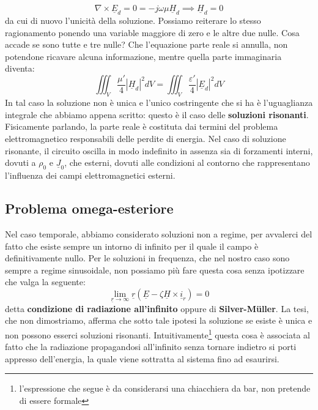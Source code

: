 \documentclass{book}
\begin{document}
\begin{equation}
    \nabla \times \underline{E}_{d} = 0 = -j \omega \mu \underline{H}_{d} \implies \underline{H}_{d}=0
\end{equation}
da cui di nuovo l'unicità della soluzione. Possiamo reiterare lo stesso ragionamento ponendo una variable maggiore di zero e le altre due nulle. Cosa accade se sono tutte e tre nulle? Che l'equazione parte reale si annulla, non potendone ricavare alcuna informazione, mentre quella parte immaginaria diventa:
\begin{equation}
    \iiint_{V} \frac{\mu'}{4}|\underline{H}_{d}|^{2}dV = \iiint_{V} \frac{\varepsilon'}{4}|\underline{E}_{d}|^{2}dV
\end{equation}
In tal caso la soluzione non è unica e l'unico costringente che si ha è l'uguaglianza integrale che abbiamo appena scritto: questo è il caso delle \textbf{soluzioni risonanti}. Fisicamente parlando, la parte reale è costituta dai termini del problema elettromagnetico responsabili delle perdite di energia. Nel caso di soluzione risonante, il circuito oscilla in modo indefinito in assenza sia di forzamenti interni, dovuti a $\rho_{0}$ e $\underline{J}_{0}$, che esterni, dovuti alle condizioni al contorno che rappresentano l'influenza dei campi elettromagnetici esterni.

\subsection{Problema omega-esteriore}
    Nel caso temporale, abbiamo considerato soluzioni non a regime, per avvalerci del fatto che esiste sempre un intorno di infinito per il quale il campo è definitivamente nullo. Per le soluzioni in frequenza, che nel nostro caso sono sempre a regime sinusoidale, non possiamo più fare questa cosa senza ipotizzare che valga la seguente:
    \begin{equation}
        \lim_{\underline{r} \to \infty} \underline{r}(\underline{E}-\zeta \underline{H} \times \underline{i}_{r}) = 0
    \end{equation}
    detta \textbf{condizione di radiazione all'infinito} oppure di \textbf{Silver-M{\"u}ller}. La tesi, che non dimostriamo, afferma che sotto tale ipotesi la soluzione se esiste è unica e non possono esserci soluzioni risonanti. Intuitivamente\footnote{l'espressione che segue è da considerarsi una chiacchiera da bar, non pretende di essere formale} questa cosa è associata al fatto che la radiazione propagandosi all'infinito senza tornare indietro si porti appresso dell'energia, la quale viene sottratta al sistema fino ad esaurirsi.
\end{document}

